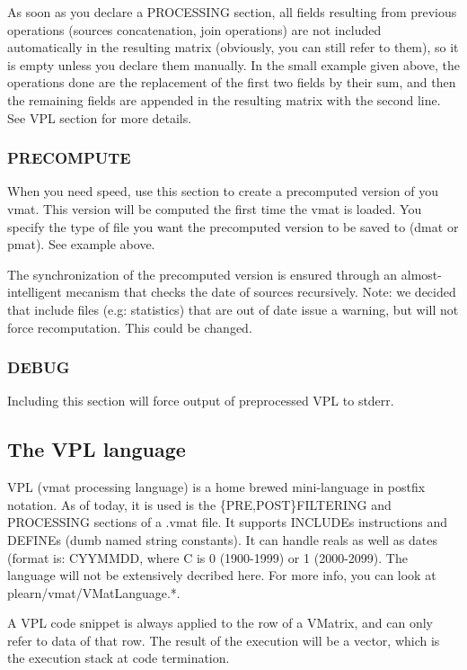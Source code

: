 \documentclass[11pt]{book}
\begin{document}
As soon as you declare a PROCESSING section, all fields resulting from previous operations (sources concatenation, join operations) are not included automatically in the resulting matrix (obviously, you can still refer to them), so it is empty unless you declare them manually. In the small example given above, the operations done are the replacement of the first two fields by their sum, and then the remaining fields are appended in the resulting matrix with the second line. See VPL section for more details.

\subsubsection{PRECOMPUTE}
When you need speed, use this section to create a precomputed version of you vmat. This version will be computed the first time the vmat is loaded. You specify the type of file you want the precomputed version to be saved to (dmat or pmat). See example above.

The synchronization of the precomputed version is ensured through an almost-intelligent mecanism that checks the date of sources recursively. Note: we decided that include files (e.g: statistics) that are out of date issue a warning, but will not force recomputation. This could be changed. 

\subsubsection{DEBUG}
Including this section will force output of preprocessed VPL to stderr.

\subsection{The VPL language}
VPL (vmat processing language) is a home brewed mini-language in postfix notation. As of today, it is used is the \{PRE,POST\}FILT\-ERING and PROCESSING sections of a .vmat file. It supports INCLUDEs instructions and DEFINEs (dumb named string constants). It can handle reals as well as dates (format is: CYYMMDD, where C is 0 (1900-1999) or 1 (2000-2099). The language will not be extensively decribed here. For more info, you can look at
plearn/vmat/VMatLanguage.*. 

A VPL code snippet is always applied to the row of a VMatrix, and can only refer to data of that row. The result of the execution will be a vector, which is the execution stack at code termination. 
\end{document}
